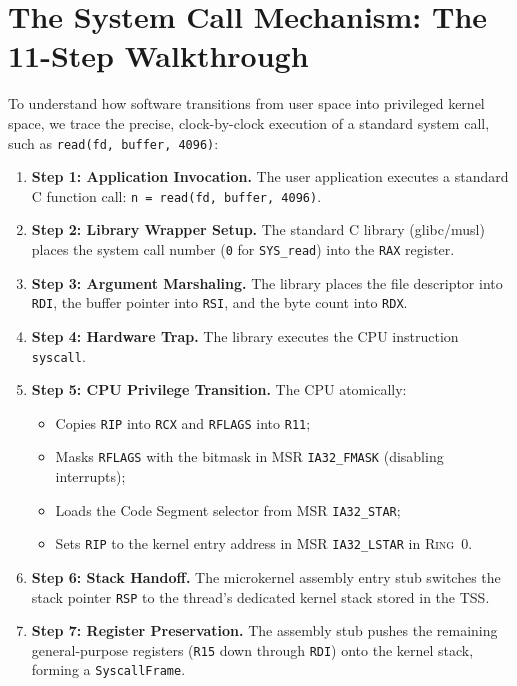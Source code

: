 \section{The System Call Mechanism: The 11-Step Walkthrough}
\label{sec:syscall_mechanics_11step}

To understand how software transitions from user space into privileged kernel space, we trace the precise, clock-by-clock execution of a standard system call, such as \texttt{read(fd, buffer, 4096)}:

\begin{enumerate}
    \item \textbf{Step 1: Application Invocation.} The user application executes a standard C function call: \texttt{n = read(fd, buffer, 4096)}.
    \item \textbf{Step 2: Library Wrapper Setup.} The standard C library (glibc/musl) places the system call number (\texttt{0} for \texttt{SYS\_read}) into the \texttt{RAX} register.
    \item \textbf{Step 3: Argument Marshaling.} The library places the file descriptor into \texttt{RDI}, the buffer pointer into \texttt{RSI}, and the byte count into \texttt{RDX}.
    \item \textbf{Step 4: Hardware Trap.} The library executes the CPU instruction \texttt{syscall}.
    \item \textbf{Step 5: CPU Privilege Transition.} The CPU atomically:
    \begin{itemize}
        \item Copies \texttt{RIP} into \texttt{RCX} and \texttt{RFLAGS} into \texttt{R11};
        \item Masks \texttt{RFLAGS} with the bitmask in MSR \texttt{IA32\_FMASK} (disabling interrupts);
        \item Loads the Code Segment selector from MSR \texttt{IA32\_STAR};
        \item Sets \texttt{RIP} to the kernel entry address in MSR \texttt{IA32\_LSTAR} in \textsc{Ring~0}.
    \end{itemize}
    \item \textbf{Step 6: Stack Handoff.} The microkernel assembly entry stub switches the stack pointer \texttt{RSP} to the thread's dedicated kernel stack stored in the TSS.
    \item \textbf{Step 7: Register Preservation.} The assembly stub pushes the remaining general-purpose registers (\texttt{R15} down through \texttt{RDI}) onto the kernel stack, forming a \texttt{SyscallFrame}.

\end{enumerate}
